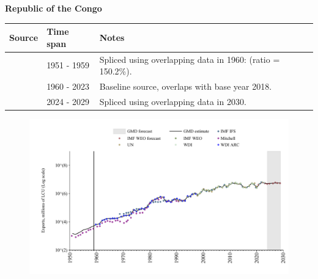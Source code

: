 \documentclass[12pt,a4paper,landscape]{article}
\begin{document}
\begin{adjustbox}{max totalsize={\paperwidth}{\paperheight},center}
\begin{minipage}[t][\textheight][t]{\textwidth}
\vspace*{0.5cm}
{}
\begin{center}
{\Large\bfseries Republic of the Congo}
\end{center}
\vspace{0.5cm}
\begin{table}[H]
\centering
\small
\begin{tabular}{|l|l|l|}
\hline
\textbf{Source} & \textbf{Time span} & \textbf{Notes} \\
\hline
\rowcolor{white}\cite{Mitchell}& 1951 - 1959 &Spliced using overlapping data in 1960: (ratio = 150.2\%).\\
\rowcolor{lightgray}\cite{WDI}& 1960 - 2023 &Baseline source, overlaps with base year 2018.\\
\rowcolor{white}\cite{IMF_WEO_forecast}& 2024 - 2029 &Spliced using overlapping data in 2030.\\
\hline
\end{tabular}
\end{table}
\begin{figure}[H]
\centering
\includegraphics[width=\textwidth,height=0.6\textheight,keepaspectratio]{graphs/COG_exports.pdf}
\end{figure}
\end{minipage}
\end{adjustbox}
\end{document}
